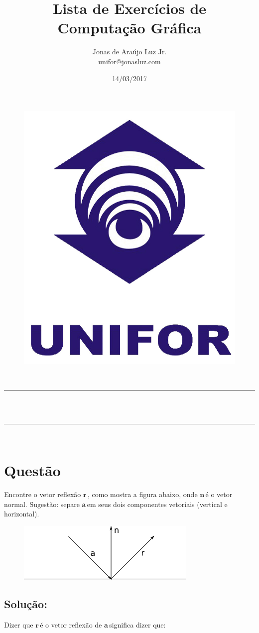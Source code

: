\documentclass[a4paper,11pt,pagenumber=true]{article}
\makeatletter
\newcommand{\linia}{\rule{\linewidth}{0.5pt}}
\newcommand{\veca}{$\mathbf{a\,}$}
\newcommand{\vecr}{$\mathbf{r\,}$}
\newcommand{\vecn}{$\mathbf{n\,}$}
\theoremstyle{mytheor}
\renewcommand{\maketitle}{
    \begin{center}
        \vspace{2ex}
        {\huge \textsc{\@title}}
        \vspace{1ex}\\
        \linia\\
        \@author\\ 
        \linia\\
        \vspace{1ex}
        \textsc{\the\institution} 
        \hfill \@date
        \vspace{4ex}
    \end{center}
}
\makeatother
\begin{document}
    \title{Lista de Exercícios de\\Computação Gráfica }

    \author{Jonas de Araújo Luz Jr.\\
    unifor@jonasluz.com}
    \date{14/03/2017}
    
    \begin{figure}[t]
    \centering
        \includegraphics[width=.2\textwidth]{images/logo-UNIFOR.jpg}
        \label{fig:logo}    
    \end{figure}
    
    \maketitle
    \tableofcontents
    \newpage
    
    \section{Questão }
    
        Encontre o vetor reflexão \vecr, como mostra a figura abaixo, onde \vecn é o vetor normal. Sugestão: separe \veca em seus dois componentes vetoriais (vertical e horizontal).
        
        \begin{figure}[h]
            \centering
            \includegraphics{images/Q-1.png}
            \label{fig:q1}
        \end{figure}
        
        \subsection*{Solução:}
        
            Dizer que \vecr é o vetor reflexão de \veca significa dizer que: 
            
\end{document}
